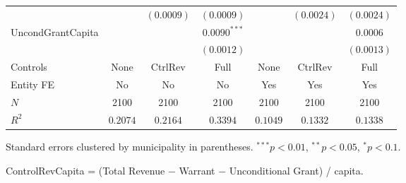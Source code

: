 \documentclass[border=10pt,varwidth=25cm]{standalone}
\renewenvironment{table}[1][]{}{}
\begin{document}
\begin{table}[H]
\begin{minipage}{\textwidth}
\begin{tabular}{lcccccc}
         &  & $(0.0009)$ & $(0.0009)$ &  & $(0.0024)$ & $(0.0024)$ \\[4pt]
        UncondGrantCapita &  &  & $0.0090^{***}$ &  &  & $0.0006$ \\
         &  &  & $(0.0012)$ &  &  & $(0.0013)$ \\[4pt]
        \midrule
        Controls & None & CtrlRev & Full & None & CtrlRev & Full \\
        Entity FE & No & No & No & Yes & Yes & Yes \\
        $N$ & 2100 & 2100 & 2100 & 2100 & 2100 & 2100 \\
        $R^2$ & $0.2074$ & $0.2164$ & $0.3394$ & $0.1049$ & $0.1332$ & $0.1338$ \\
        \bottomrule
    \end{tabular}

    \vspace{6pt}
    {\scriptsize Standard errors clustered by municipality in parentheses. $^{***}p<0.01$, $^{**}p<0.05$, $^{*}p<0.1$.}

    {\scriptsize ControlRevCapita = (Total Revenue $-$ Warrant $-$ Unconditional Grant) / capita.}
    \end{minipage}
\end{table}
\end{document}
